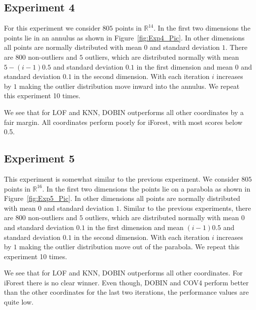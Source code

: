 \documentclass[letter,12pt]{article}
\begin{document}
{\color{blue}
\subsection{Experiment 4}

For this experiment we consider $805$ points in $\mathbb{R}^{14}$. In the first two dimensions the points lie in an annulus as shown in Figure~\ref{fig:Exp4_Pic}. In other dimensions all points are normally distributed with mean $0$ and standard deviation $1$. There are $800$  non-outliers and $5$ outliers, which are distributed normally with mean $5 - (i-1)0.5$ and standard deviation $0.1$ in the first dimension and mean $0$ and standard deviation $0.1$ in the second dimension. With each iteration $i$ increases by $1$ making the outlier distribution move inward into the annulus. We repeat this experiment 10 times. 

We see that for LOF and KNN,  DOBIN outperforms all other coordinates by a fair margin. All coordinates perform poorly for iForest, with most scores below 0.5. 


\subsection{Experiment 5}

This experiment is somewhat similar to the previous experiment. We consider $805$ points in $\mathbb{R}^{16}$. In the first two dimensions the points lie on a parabola as shown in Figure~\ref{fig:Exp5_Pic}. In other dimensions all points are normally distributed with mean $0$ and standard deviation $1$. Similar to the previous experiments, there are $800$  non-outliers and $5$ outliers, which are distributed normally with mean $0$ and standard deviation $0.1$ in the first dimension and mean $(i-1)0.5$ and standard deviation $0.1$ in the second dimension. With each iteration $i$ increases by $1$ making the outlier distribution move out of the parabola.  We repeat this experiment 10 times. 

We see that for LOF and KNN,  DOBIN outperforms all other coordinates. For iForest there is no clear winner. Even though, DOBIN and COV4 perform better than the other coordinates for the last two iterations, the performance values are quite low. 

}
\end{document}
